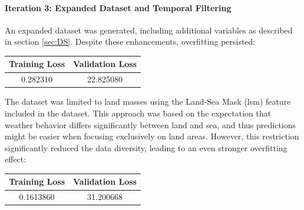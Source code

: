 \documentclass[conference,9pt]{IEEEtran}
\begin{document}
\paragraph{Iteration 3: Expanded Dataset and Temporal Filtering}
An expanded dataset was generated, including additional variables as described in section \ref{sec:DS}. Despite these enhancements, overfitting persisted:
\begin{center}
    \begin{tabular}{c|c}
        Training Loss & Validation Loss \\ 
        \hline 
        0.282310 & 22.825080 \\
    \end{tabular}
\end{center}
The dataset was limited to land masses using the Land-Sea Mask (lsm) feature included in the dataset. This approach was based on the expectation that weather behavior differs significantly between land and sea, and thus predictions might be easier when focusing exclusively on land areas. However, this restriction significantly reduced the data diversity, leading to an even stronger overfitting effect:
\begin{center}
    \begin{tabular}{c|c}
        Training Loss & Validation Loss \\ 
        \hline 
        0.1613860 & 31.200668 \\
    \end{tabular}
\end{center}
\end{document}
